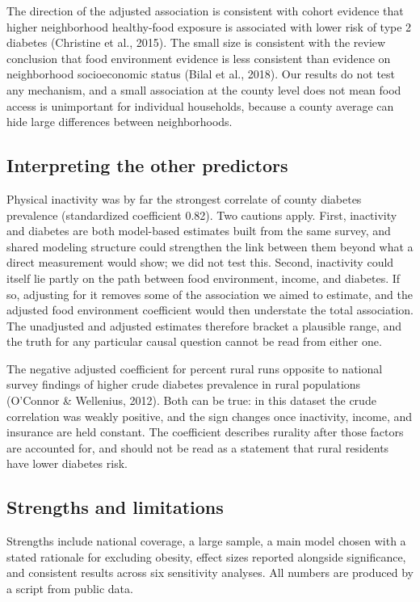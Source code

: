 \documentclass[12pt]{article}
\begin{document}
The direction of the adjusted association is consistent with cohort evidence that higher neighborhood healthy-food exposure is associated with lower risk of type 2 diabetes (Christine et al., 2015). The small size is consistent with the review conclusion that food environment evidence is less consistent than evidence on neighborhood socioeconomic status (Bilal et al., 2018). Our results do not test any mechanism, and a small association at the county level does not mean food access is unimportant for individual households, because a county average can hide large differences between neighborhoods.

\subsection*{Interpreting the other predictors}
Physical inactivity was by far the strongest correlate of county diabetes prevalence (standardized coefficient 0.82). Two cautions apply. First, inactivity and diabetes are both model-based estimates built from the same survey, and shared modeling structure could strengthen the link between them beyond what a direct measurement would show; we did not test this. Second, inactivity could itself lie partly on the path between food environment, income, and diabetes. If so, adjusting for it removes some of the association we aimed to estimate, and the adjusted food environment coefficient would then understate the total association. The unadjusted and adjusted estimates therefore bracket a plausible range, and the truth for any particular causal question cannot be read from either one.

The negative adjusted coefficient for percent rural runs opposite to national survey findings of higher crude diabetes prevalence in rural populations (O'Connor \& Wellenius, 2012). Both can be true: in this dataset the crude correlation was weakly positive, and the sign changes once inactivity, income, and insurance are held constant. The coefficient describes rurality after those factors are accounted for, and should not be read as a statement that rural residents have lower diabetes risk.

\subsection*{Strengths and limitations}
Strengths include national coverage, a large sample, a main model chosen with a stated rationale for excluding obesity, effect sizes reported alongside significance, and consistent results across six sensitivity analyses. All numbers are produced by a script from public data.
\end{document}
